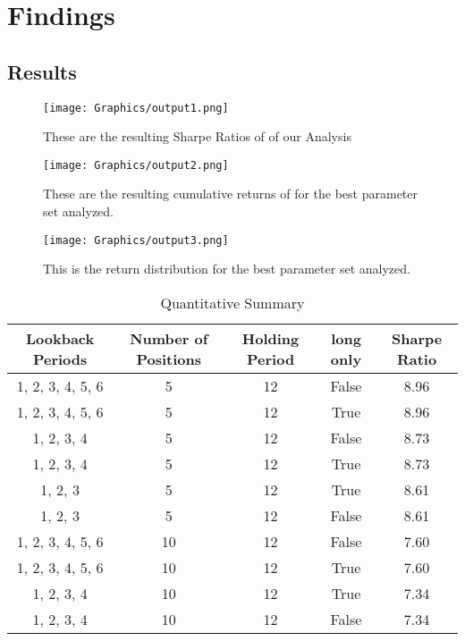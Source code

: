 \documentclass[11pt,a4paper,english,oneside]{book}
\begin{document}

\chapter{Findings}
\section{Results}
\begin{figure}[h] %
    \centering
    \texttt{[image: Graphics/output1.png]}
    \caption[Sharpe Ratios]{These are the resulting Sharpe Ratios of of our Analysis}
    \label{fig:my_label}
\end{figure}

\begin{figure}[h] %
    \centering
    \texttt{[image: Graphics/output2.png]}
    \caption[Cumulative Returns]{These are the resulting cumulative returns of for the best parameter set analyzed.}
    \label{fig:my_label}
\end{figure}

\begin{figure}[h] %
    \centering
    \texttt{[image: Graphics/output3.png]}
    \caption[Return Distribution]{This is the return distribution for the best parameter set analyzed.}
    \label{fig:my_label}
\end{figure}

\begin{table}[ht]
\centering
\caption{Quantitative Summary}
\begin{tabular}{|c|c|c|c|c|} %
\hline %
\textbf{Lookback Periods} & \textbf{Number of Positions} & \textbf{Holding Period} & \textbf{long only} & \textbf{Sharpe Ratio} \\ %
\hline
1, 2, 3, 4, 5, 6 & 5 & 12 & False & 8.96 \\
1, 2, 3, 4, 5, 6 & 5 & 12 & True & 8.96\\
1, 2, 3, 4 & 5 & 12 & False & 8.73\\
1, 2, 3, 4 & 5 & 12 & True & 8.73\\
1, 2, 3 & 5 & 12 & True & 8.61\\
1, 2, 3 & 5 & 12 & False & 8.61\\
1, 2, 3, 4, 5, 6 & 10 & 12 & False & 7.60\\
1, 2, 3, 4, 5, 6 & 10 & 12 & True & 7.60\\
1, 2, 3, 4 & 10 & 12 & True & 7.34\\
1, 2, 3, 4 & 10 & 12 & False & 7.34\\
\hline
\end{tabular}
\end{table}

\printbibliography
\end{document}
